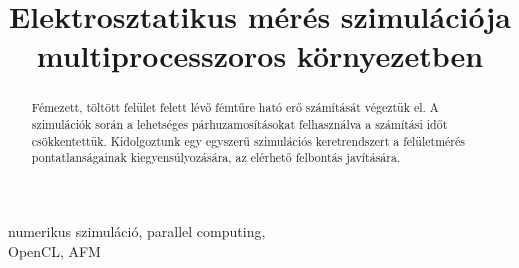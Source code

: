 \documentclass[9pt,conference]{IEEEtran}
\begin{document}
	\title{Elektrosztatikus mérés szimulációja multiprocesszoros környezetben}
	
	\author{
		  
		\and
		 
	}
	
	\maketitle

	\begin{abstract}
	 Fémezett, töltött felület felett lévő fémtűre ható erő számítását végeztük el.
	 A szimulációk során a lehetséges párhuzamosításokat felhasználva a számítási időt csökkentettük.
	 Kidolgoztunk egy egyszerű szimulációs keretrendszert a felületmérés pontatlanságainak kiegyensúlyozására, az elérhető felbontás javítására.
	\end{abstract}

	\begin{IEEEkeywords}
	 numerikus szimuláció, parallel computing,\\ OpenCL, AFM 
	\end{IEEEkeywords}

	
	
	
	
	
	
	
	
	
	
	
	
	
	
	
\end{document}
